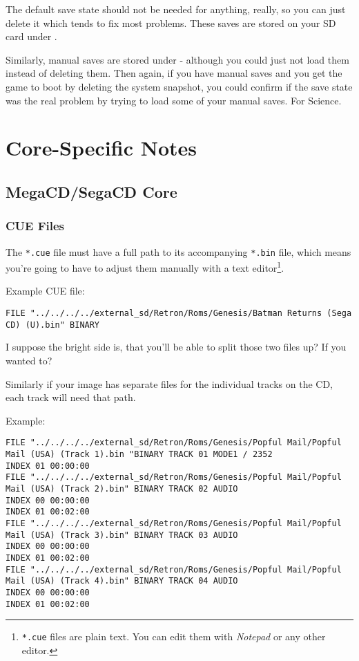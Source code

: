 \documentclass[english]{retronlabo-manual}
\begin{document}
The default save state should not be needed for anything, really, so you can just delete it which tends to fix most problems. These saves are stored on your SD card under .

Similarly, manual saves are stored under  - although you could just not load them instead of deleting them. Then again, if you have manual saves and you get the game to boot by deleting the system snapshot, you could confirm if the save state was the real problem by trying to load some of your manual saves. For Science.

\glsaddallunused
\printglossary[title=File Formats, toctitle=Supported ROM File Formats, type=file-type, nonumberlist]

\section{Core-Specific Notes}

\subsection{MegaCD/SegaCD Core}

\subsubsection{CUE Files}

The \texttt{*.cue} file must have a full path to its accompanying \texttt{*.bin} file, which means you're going to have to adjust them manually with a text editor\footnote{\texttt{*.cue} files are plain text. You can edit them with \emph{Notepad} or any other editor.}.

Example CUE file:

\begin{lstlisting}[breaklines]
FILE "../../../../external_sd/Retron/Roms/Genesis/Batman Returns (Sega CD) (U).bin" BINARY
\end{lstlisting}

I suppose the bright side is, that you'll be able to split those two files up? If you wanted to?

Similarly if your image has separate files for the individual tracks on the CD, each track will need that path.

Example:

\begin{lstlisting}[breaklines=true]
FILE "../../../../external_sd/Retron/Roms/Genesis/Popful Mail/Popful Mail (USA) (Track 1).bin "BINARY TRACK 01 MODE1 / 2352
INDEX 01 00:00:00
FILE "../../../../external_sd/Retron/Roms/Genesis/Popful Mail/Popful Mail (USA) (Track 2).bin" BINARY TRACK 02 AUDIO
INDEX 00 00:00:00
INDEX 01 00:02:00
FILE "../../../../external_sd/Retron/Roms/Genesis/Popful Mail/Popful Mail (USA) (Track 3).bin" BINARY TRACK 03 AUDIO
INDEX 00 00:00:00
INDEX 01 00:02:00
FILE "../../../../external_sd/Retron/Roms/Genesis/Popful Mail/Popful Mail (USA) (Track 4).bin" BINARY TRACK 04 AUDIO
INDEX 00 00:00:00
INDEX 01 00:02:00
\end{lstlisting}
\end{document}
